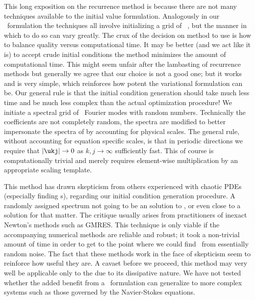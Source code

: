 This long exposition on the recurrence method is
because there are not many techniques available
to the initial value formulation. Analogously
in our \spt\
formulation the techniques all involve
initializing a grid of \spt\ \Fcs, but
the manner in which to do so can vary greatly.
The crux of the decision on method to use
is how to balance quality
versus computational time.
It may be better (and we act like it is)
to accept crude initial conditions
the method minimizes the amount of computational time.
This might seem unfair after the
lambasting of recurrence methods but generally we agree that
our choice is not a good one; but it works and is very simple,
which reinforces how potent the variational formulation can be.
Our general rule is that
the initial condition generation should take much less time
and be much less complex than the actual optimization procedure!
We initiate a spectral grid of \spt\ Fourier modes
with random numbers. Technically the
coefficients are not completely random,
the spectra are modified to better impersonate
the spectra of \twots by accounting for
physical scales.
The general rule, without accounting for
equation specific scales, is that in
periodic directions we require that
$|\ukj |\to 0$ as $k,j \to \infty$ sufficiently fast.
This of course
is computationally trivial and merely
requires element-wise multiplication by
an appropriate scaling template.

This method has drawn skepticism
from others experienced
with chaotic PDEs (especially finding {\po}s),
regarding our initial condition generation procedure.
A randomly assigned spectrum
not going to be an solution to ,
or even close to a solution for that matter.
The critique usually arises from practitioners
of inexact Newton's methods such as GMRES.
This technique is only viable if the
accompanying numerical methods are reliable and robust; it took
a non-trivial amount of time in order to get to
the point where we could find \twots\ from essentially random noise.
The fact that these methods work in the face of skepticism
seem to reinforce how useful they are.
A cavaet before we proceed,
this method may very well be applicable only to the \KSe due to its
dissipative nature. We have not tested whether the added benefit
from a \spt\ formulation can generalize to more complex
systems such as those governed by the Navier-Stokes equations.


